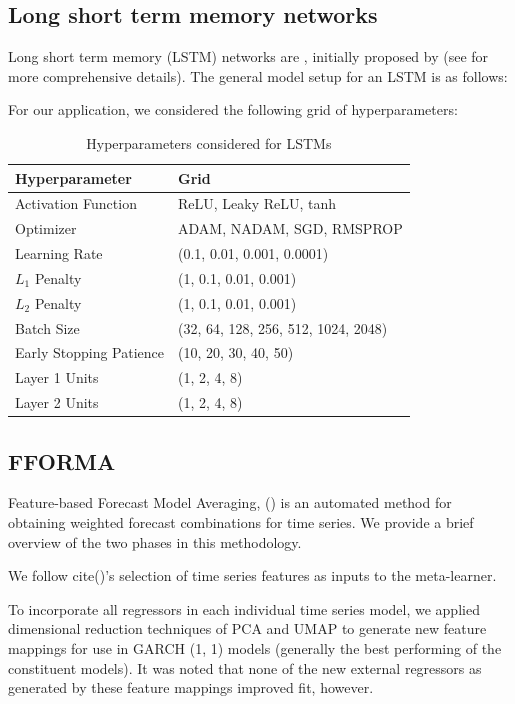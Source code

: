 \documentclass{article}
\begin{document}
\FloatBarrier
\subsection{Long short term memory networks}
Long short term memory (LSTM) networks are , initially proposed by \cite{hochreiter_long_1997} (see for more comprehensive details). The general model setup for an LSTM is as follows:

For our application, we considered the following grid of hyperparameters:
\begin{table}[!htb]
	\begin{tabular}{|ll|}
		\hline
		Hyperparameter & Grid \\ \hline
		Activation Function & ReLU, Leaky ReLU, tanh \\
		Optimizer & ADAM, NADAM, SGD, RMSPROP \\
		Learning Rate & (0.1, 0.01, 0.001, 0.0001) \\
		$L_1$ Penalty & (1, 0.1, 0.01, 0.001) \\
		$L_2$ Penalty & (1, 0.1, 0.01, 0.001) \\
		Batch Size & (32, 64, 128, 256, 512, 1024, 2048) \\
		Early Stopping Patience & (10, 20, 30, 40, 50) \\ 
		Layer 1 Units & (1, 2, 4, 8) \\
		Layer 2 Units & (1, 2, 4, 8) \\ \hline
	\end{tabular}
	\caption{Hyperparameters considered for LSTMs}
\end{table}

\FloatBarrier
\subsection{FFORMA}
Feature-based Forecast Model Averaging, (\cite{montero-manso_fforma_2020}) is an automated method for obtaining weighted forecast combinations for time series. We provide a brief overview of the two phases in this methodology.

We follow cite()'s selection of time series features as inputs to the meta-learner. 

To incorporate all regressors in each individual time series model, we applied dimensional reduction techniques of PCA and UMAP to generate new feature mappings for use in GARCH (1, 1) models (generally the best performing of the constituent models). It was noted that none of the new external regressors as generated by these feature mappings improved fit, however.
\end{document}
